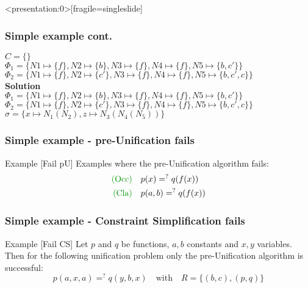 		\begin{frame}<presentation:0>[fragile=singleslide]
	\frametitle{Simple example cont.}
	\(C=\{\}\)\\
	\(\Phi_1=\{N1\mapsto \{f\}, N2\mapsto \{b\}, N3\mapsto \{f\} , N4\mapsto \{f\},N5\mapsto \{b,c'\}\}\)\\
	\(\Phi_2=\{N1\mapsto \{f\}, N2\mapsto \{c'\}, N3\mapsto \{f\} , N4\mapsto \{f\},N5\mapsto \{b,c',c\}\}\)\\
	
	\vspace{0.5cm}
	\textbf{Solution}\\
	\(\Phi_1=\{N1\mapsto \{f\}, N2\mapsto \{b\}, N3\mapsto \{f\} , N4\mapsto \{f\},N5\mapsto \{b,c'\}\}\)\\
	\(\Phi_2=\{N1\mapsto \{f\}, N2\mapsto \{c'\}, N3\mapsto \{f\} , N4\mapsto \{f\},N5\mapsto \{b,c',c\}\}\)\\
	\(\sigma=\{x \mapsto N_1(N_2), z \mapsto N_3(N_4(N_5))\}\)\\
		\end{frame}
		
	\begin{frame}[fragile=singleslide]
	\frametitle{Simple example - pre-Unification fails}
	\begin{exampleblock}{Example [Fail pU] }
	Examples where the pre-Unification algorithm fails:
		\begin{gather}
		\begin{align}
				\text{\textcolor[rgb]{0,0.58,0}{(Occ)}}\quad & p(x) =^? q(f(x))\\
				\text{\textcolor[rgb]{0,0.58,0}{(Cla)}}\quad & p(a,b) =^? q(f(x))
		\end{align}
		\end{gather}
	\end{exampleblock}
		\vspace{0.5cm}
		\end{frame}
	
	\begin{frame}[fragile=singleslide]
	\frametitle{Simple example - Constraint Simplification fails}		
	\begin{exampleblock}{Example [Fail CS]}
	Let $p$ and $q$ be functions, $a,b$ constants and $x,y$ variables. Then for the following unification problem only the pre-Unification algorithm is successful:
	\[p(a,x,a) =^? q(y,b,x) \quad \text{with} \quad R=\{(b,c),(p,q)\}\]\\
	\end{exampleblock}
	\end{frame}
	
